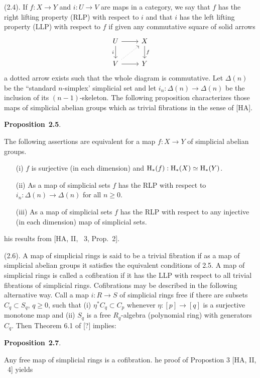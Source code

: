\documentclass[10pt,reqno]{amsart}
\newenvironment{prop}[1]{
\par\medskip\noindent\textbf{Proposition}~\textbf{#1}.\,\itshape
}
\renewcommand{\H}{\mathrm{H}}
\begin{document}
(2.4). If $f:X\to Y$ and $i:U\to V$ are maps in a category, we say that $f$ has the
right lifting property (RLP) with respect to $i$ and that $i$ has the left lifting
property (LLP) with respect to $f$ if given any commutative square of solid arrows
\[
  \begin{tikzcd}
    U\ar[r]\ar[d,"i"'] & X\ar[d,"f"]\\
    V\ar[r]\ar[ur,dotted] & Y
  \end{tikzcd}
\]
a dotted arrow exists such that the whole diagram is commutative. Let $\Delta(n)$ be the
``standard $n$-simplex' simplicial set and let $i_n:\Delta(n)\to\Delta(n)$ be the
inclusion of its $(n-1)$-skeleton. The following proposition characterizes those maps
of simplicial abelian groups which as trivial fibrations in the sense of [HA].

\begin{prop}{2.5}
The following assertions are equivalent for a map $f:X\to Y$ of simplicial abelian
groups.
\begin{itemize}
  \item[(i)] $f$ is surjective (in each dimension) and $\H_\ast(f):\H_\ast(X)\simeq\H_\ast(Y)$.
  \item[(ii)] As a map of simplicial sets $f$ has the RLP with respect to
        $i_n:\Delta(n)\to\Delta(n)$ for all $n\geq 0$.
  \item[(iii)] As a map of simplicial sets $f$ has the RLP with respect to any injective
        (in each dimension) map of simplicial sets.
\end{itemize}
\end{prop}
This results from [HA, II, \textsection~3, Prop.~2].

(2.6). A map of simplicial rings is said to be a trivial fibration if as a map of
simplicial abelian groups it satisfies the equivalent conditions of 2.5. A map of
simplicial rings is called a cofibration if it has the LLP with respect to all trivial
fibrations of simplicial rings. Cofibrations may be described in the following
alternative way. Call a map $i:R\to S$ of simplicial rings free if there are subsets
$C_q\subset S_q$, $q\geq 0$, such that (i) $\eta^\ast C_q\subset C_p$ whenever
$\eta:[p]\to[q]$ is a surjective monotone map and (ii) $S_q$ is a free $R_q$-algebra
(polynomial ring) with generators $C_q$. Then Theorem 6.1 of [?] implies:

\begin{prop}{2.7}
Any free map of simplicial rings is a cofibration.
\end{prop}
The proof of Propostion 3 [HA, II, \textsection~4] yields
\end{document}
